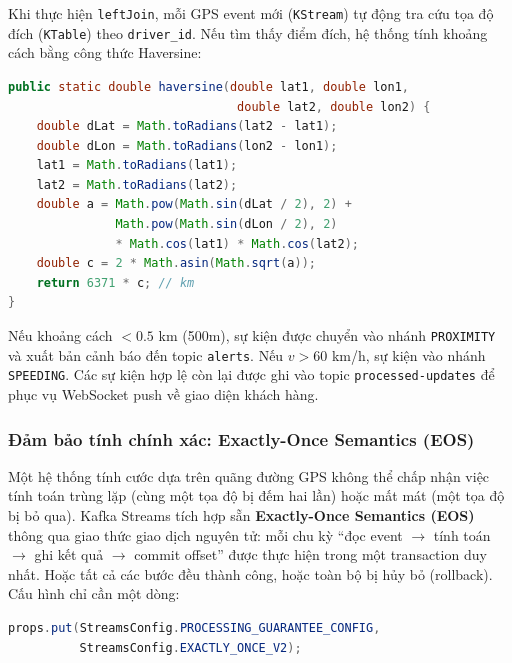 \noindent
Khi thực hiện \texttt{leftJoin}, mỗi GPS event mới (\texttt{KStream}) tự động tra cứu tọa độ đích (\texttt{KTable}) theo \texttt{driver\_id}. Nếu tìm thấy điểm đích, hệ thống tính khoảng cách bằng công thức Haversine:

\begin{lstlisting}[language=Java, caption={Haversine — Công thức tính khoảng cách giữa hai tọa độ trên mặt cầu}, label={lst:haversine}]
public static double haversine(double lat1, double lon1,
                                double lat2, double lon2) {
    double dLat = Math.toRadians(lat2 - lat1);
    double dLon = Math.toRadians(lon2 - lon1);
    lat1 = Math.toRadians(lat1);
    lat2 = Math.toRadians(lat2);
    double a = Math.pow(Math.sin(dLat / 2), 2) +
               Math.pow(Math.sin(dLon / 2), 2)
               * Math.cos(lat1) * Math.cos(lat2);
    double c = 2 * Math.asin(Math.sqrt(a));
    return 6371 * c; // km
}
\end{lstlisting}

Nếu khoảng cách $< 0.5$ km (500m), sự kiện được chuyển vào nhánh \texttt{PROXIMITY} và xuất bản cảnh báo đến topic \texttt{alerts}. Nếu $v > 60$ km/h, sự kiện vào nhánh \texttt{SPEEDING}. Các sự kiện hợp lệ còn lại được ghi vào topic \texttt{processed-updates} để phục vụ WebSocket push về giao diện khách hàng.

\subsubsection{Đảm bảo tính chính xác: Exactly-Once Semantics (EOS)}
\label{sec:exactly-once}

Một hệ thống tính cước dựa trên quãng đường GPS không thể chấp nhận việc tính toán trùng lặp (cùng một tọa độ bị đếm hai lần) hoặc mất mát (một tọa độ bị bỏ qua). Kafka Streams tích hợp sẵn \textbf{Exactly-Once Semantics (EOS)} thông qua giao thức giao dịch nguyên tử: mỗi chu kỳ ``đọc event $\rightarrow$ tính toán $\rightarrow$ ghi kết quả $\rightarrow$ commit offset'' được thực hiện trong một transaction duy nhất. Hoặc tất cả các bước đều thành công, hoặc toàn bộ bị hủy bỏ (rollback). Cấu hình chỉ cần một dòng:

\begin{lstlisting}[language=Java, caption={Cấu hình Exactly-Once Semantics}, label={lst:eos-config}]
props.put(StreamsConfig.PROCESSING_GUARANTEE_CONFIG,
          StreamsConfig.EXACTLY_ONCE_V2);
\end{lstlisting}

